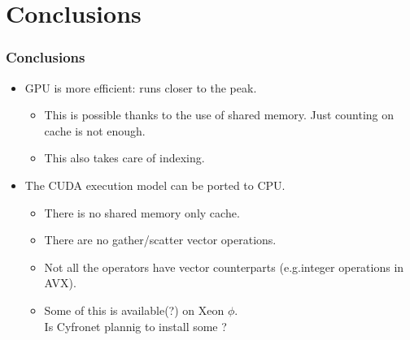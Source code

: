 \documentclass{beamer}
\begin{document}
\section{Conclusions}

\begin{frame}
\frametitle{Conclusions}
\begin{itemize}
\item GPU is more efficient: runs closer to the peak.
\begin{itemize}
\item This is possible thanks to the use of shared memory. Just
  counting on cache is not enough.
\item This also takes care of indexing.
\end{itemize}
\item The CUDA execution model can be ported to CPU.
\begin{itemize}
\item There is no shared memory only cache.
\item There are no gather/scatter vector operations.
\item Not all the  operators have vector counterparts (e.g.integer operations in AVX).
\item Some of this is available(?) on Xeon $\phi$. \\
Is Cyfronet plannig to install some ? 
\end{itemize}
\end{itemize}
\end{frame}
\end{document}
